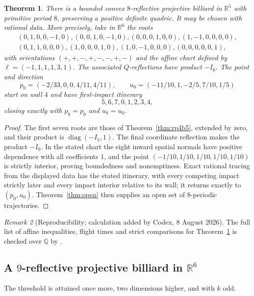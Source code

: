 \documentclass[11pt,a4paper]{article}
\theoremstyle{plain}
\newtheorem{theorem}{Theorem}[section]
\theoremstyle{definition}
\theoremstyle{remark}
\newtheorem{remark}[theorem]{Remark}
\begin{document}
\begin{theorem}\label{thm:rp5b6}
There is a bounded convex $8$-reflective projective billiard in $\mathbb{R}^5$
with primitive period $8$, preserving a positive definite quadric.  It may be
chosen with rational data.  More precisely, take in $\mathbb{R}^6$ the roots
\[
\begin{gathered}
(0,1,0,0,-1,0),(0,0,1,0,-1,0),(0,0,0,1,0,0),(1,-1,0,0,0,0),\\
(0,1,1,0,0,0),(1,0,0,0,1,0),(1,0,-1,0,0,0),(0,0,0,0,0,1),
\end{gathered}
\]
with orientations $(+,+,-,+,-,-,+,-)$ and the affine chart defined by
$\ell=(-1,1,1,1,3,1)$.  The associated $Q$-reflections have product $-I_6$.
The point and direction
\[
p_0=(-2/33,0,0,4/11,4/11),\qquad
u_0=(-11/10,1,-2/5,7/10,1/5)
\]
start on wall $4$ and have first-impact itinerary
\[
5,6,7,0,1,2,3,4,
\]
closing exactly with $p_8=p_0$ and $u_8=u_0$.
\end{theorem}

\begin{proof}
The first seven roots are those of Theorem~\ref{thm:rp4b5}, extended by zero,
and their product is $\operatorname{diag}(-I_5,1)$.  The final coordinate
reflection makes the product $-I_6$.  In the stated chart the eight inward
spatial normals have positive dependence with all coefficients $1$, and the
point $(-1/10,1/10,1/10,1/10,1/10)$ is strictly interior, proving boundedness
and nonemptiness.  Exact rational tracing from the displayed data has the stated
itinerary, with every competing impact strictly later and every impact interior
relative to its wall; it returns exactly to $(p_0,u_0)$.  Theorem~\ref{thm:open}
then supplies an open set of $8$-periodic trajectories.
\end{proof}

\begin{remark}[Reproducibility; calculation added by Codex, 8 August 2026]
The full list of affine inequalities, flight times and strict comparisons for
Theorem~\ref{thm:rp5b6} is checked over $\mathbb{Q}$ by
.
\end{remark}

\subsection{A $9$-reflective projective billiard in $\mathbb{R}^6$}

The threshold is attained once more, two dimensions higher, and with $k$ odd.
\end{document}

